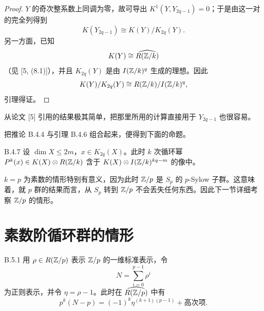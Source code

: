 \begin{proof}
  $Y$ 的奇次整系数上同调为零，故可导出 $K^1(Y,Y_{2q-1})=0$；于是由这一对的完全列得到
  \[
    K(Y_{2q-1})\cong K(Y)/K_{2q}(Y).
  \]
  另一方面，已知
  \[
    K(Y)\cong\widehat{R(\mathbb{Z}/k)}
  \]
  （见 [5, (8.1)]），并且 $K_{2q}(Y)$ 是由 $I(\mathbb{Z}/k)^q$ 生成的理想。因此
  \[
    K(Y)/K_{2q}(Y)\cong R(\mathbb{Z}/k)/I(\mathbb{Z}/k)^q,
  \]
  引理得证。
\end{proof}


\begin{remark}{}
  从论文 [5] 引用的结果极其简单，把那里所用的计算直接用于 $Y_{2q-1}$ 也很容易。
\end{remark}

把推论 B.4.4 与引理 B.4.6 组合起来，便得到下面的命题。

\begin{proposition}{B.4.7}
  设 $\dim X\le 2m$，$x\in K_{2q}(X)$。此时 $k$ 次循环幂 $P^k(x)\in K(X)\otimes R(\mathbb{Z}/k)$ 含于 $K(X)\otimes I(\mathbb{Z}/k)^{kq-m}$ 的像中。
\end{proposition}

$k=p$ 为素数的情形特别有意义，因为此时 $\mathbb{Z}/p$ 是 $S_p$ 的 $p$-Sylow 子群。这意味着，就 $p$ 群的结果而言，从 $S_p$ 转到 $\mathbb{Z}/p$ 不会丢失任何东西。因此下一节详细考察 $\mathbb{Z}/p$ 的情形。

\section{素数阶循环群的情形}

\begin{lemma*}{B.5.1}
  用 $\rho\in R(\mathbb{Z}/p)$ 表示 $\mathbb{Z}/p$ 的一维标准表示，令
  \[
    N=\sum_{i=0}^{p-1}\rho^i
  \]
  为正则表示，并令 $\eta=\rho-1$。此时在 $\widehat{R(\mathbb{Z}/p)}$ 中有
  \[
    p^k(N-p)=(-1)^k\eta^{(k+1)(p-1)}+\text{高次项}.
  \]
\end{lemma*}

